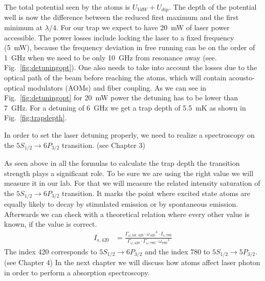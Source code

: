 The total potential seen by the atoms is \(U_{VdW} + U_{dip} \). The depth of the 
potential well is now the difference between the reduced first maximum and the 
first minimum at \(\lambda/4 \). For our trap we expect to have \SI{20}{\milli\watt} 
of laser power accessible. The power losses include locking the laser to a fixed
frequency (\SI{5}{\milli\watt}), because the frequency deviation in free running 
can be on the order of \SI{1}{\giga\hertz} when we need to be only \SI{10}{\giga\hertz}
from resonance away (see. Fig.~\ref{fig:detuningopt}). One also needs to take into 
account the losses due to the optical path of the beam before reaching the atoms,
which will contain acousto-optical modulators (AOMs) and fiber coupling. As we 
can see in Fig.~\ref{fig:detuningopt} for \SI{20}{\milli\watt} power the detuning 
has to be lower than \SI{7}{\giga\hertz}. For a detuning of \SI{6}{\giga\hertz} 
we get a trap depth of \SI{5.5}{\milli\kelvin} as shown in Fig.~\ref{fig:trapdepth}.

In order to set the laser detuning properly, we need to realize a spectroscopy 
on the \(5S_{1/2} \rightarrow 6P_{3/2} \) transition. (see Chapter 3)

As seen above in all the formulas to calculate the trap depth the transition
strength plays a significant role. To be sure we are using the right value we will
measure it in our lab. For that we will measure the related intensity saturation
of the \(5S_{1/2} \rightarrow 6P_{3/2} \) transition. It marks the point where 
excited state atoms are equally likely to decay by stimulated emission or by 
spontaneous emission. Afterwards we can check with a theoretical relation where 
every other value is known, if the value is correct.
\begin{align}
    I_{s,420} &= \frac{\Gamma_{\omega,tot,420}\cdot{\omega_{420}}^3\cdot I_{s,780}}
    {\Gamma_{\omega,420}\cdot\Gamma_{\omega,780}\cdot{\omega_{780}}^3}
\end{align}  
The index 420 corresponds to \(5S_{1/2} \rightarrow 6P_{3/2} \) and the index 780 
to \(5S_{1/2} \rightarrow 5P_{3/2} \). (see Chapter 4)
In the next chapter we will discuss how atoms affect laser photon in order to 
perform a absorption spectroscopy.

